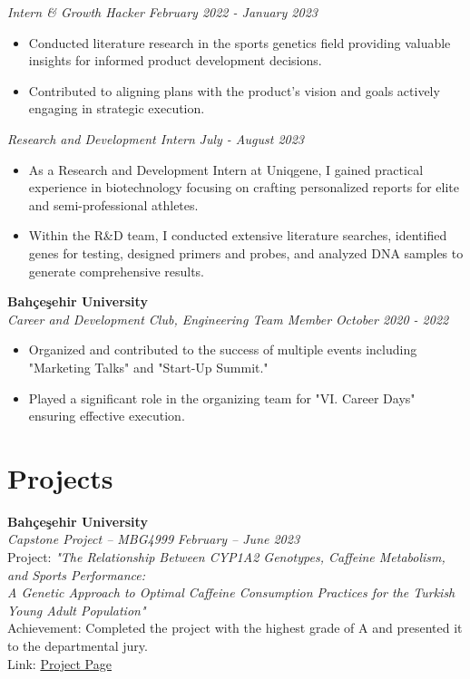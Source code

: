 \documentclass[a4paper,10pt]{article}
\newcommand{\sepspace}{\noindent\makebox[\linewidth]{\rule{\textwidth}{0.4pt}}}
\begin{document}
\noindent\textit{Intern \& Growth Hacker} \hfill \textit{February 2022 - January 2023} \\
\begin{itemize}[noitemsep]
    \item Conducted literature research in the sports genetics field providing valuable insights for informed product development decisions.
    \item Contributed to aligning plans with the product's vision and goals actively engaging in strategic execution.
\end{itemize}

\noindent\textit{Research and Development Intern} \hfill \textit{July - August 2023} \\
\begin{itemize}[noitemsep]
    \item As a Research and Development Intern at Uniqgene, I gained practical experience in biotechnology focusing on crafting personalized reports for elite and semi-professional athletes.
    \item Within the R\&D team, I conducted extensive literature searches, identified genes for testing, designed primers and probes, and analyzed DNA samples to generate comprehensive results.
\end{itemize}

\noindent\textbf{Bahçeşehir University} \\
\textit{Career and Development Club, Engineering Team Member} \hfill \textit{October 2020 - 2022} \\
\begin{itemize}[noitemsep]
    \item Organized and contributed to the success of multiple events including "Marketing Talks" and "Start-Up Summit."
    \item Played a significant role in the organizing team for "VI. Career Days" ensuring effective execution.
\end{itemize}

\sepspace

\section*{Projects}
\noindent\textbf{Bahçeşehir University} \\
\textit{Capstone Project – MBG4999} \hfill \textit{February – June 2023} \\
Project: \textit{"The Relationship Between CYP1A2 Genotypes, Caffeine Metabolism, and Sports Performance: \\ 
A Genetic Approach to Optimal Caffeine Consumption Practices for the Turkish Young Adult Population"} \\
Achievement: Completed the project with the highest grade of A and presented it to the departmental jury. \\
Link: \href{https://github.com/ugrersoz/Capstone_Project}{Project Page}
\end{document}

